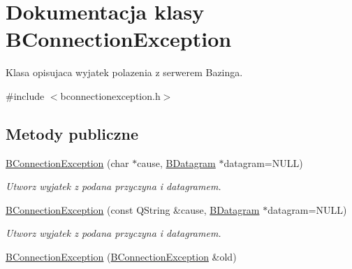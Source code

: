 \hypertarget{class_b_connection_exception}{
\section{Dokumentacja klasy BConnectionException}
\label{class_b_connection_exception}
}


Klasa opisujaca wyjatek polazenia z serwerem Bazinga.  




{\ttfamily \#include $<$bconnectionexception.h$>$}

\subsection*{Metody publiczne}
\begin{DoxyCompactItemize}
\item 
\hypertarget{class_b_connection_exception_a8434b332707e6b981af493ac142ddc34}{
\hyperlink{class_b_connection_exception_a8434b332707e6b981af493ac142ddc34}{BConnectionException} (char $\ast$cause, \hyperlink{class_b_datagram}{BDatagram} $\ast$datagram=NULL)}
\label{class_b_connection_exception_a8434b332707e6b981af493ac142ddc34}

\begin{DoxyCompactList}\small\item\em Utworz wyjatek z podana przyczyna i datagramem. \item\end{DoxyCompactList}\item 
\hypertarget{class_b_connection_exception_ae805b541430e9a3e2af7750a4385ca64}{
\hyperlink{class_b_connection_exception_ae805b541430e9a3e2af7750a4385ca64}{BConnectionException} (const QString \&cause, \hyperlink{class_b_datagram}{BDatagram} $\ast$datagram=NULL)}
\label{class_b_connection_exception_ae805b541430e9a3e2af7750a4385ca64}

\begin{DoxyCompactList}\small\item\em Utworz wyjatek z podana przyczyna i datagramem. \item\end{DoxyCompactList}\item 
\hypertarget{class_b_connection_exception_aa28e0f3ae8e5dc4a2154f106a289e470}{
\hyperlink{class_b_connection_exception_aa28e0f3ae8e5dc4a2154f106a289e470}{BConnectionException} (\hyperlink{class_b_connection_exception}{BConnectionException} \&old)}
\label{class_b_connection_exception_aa28e0f3ae8e5dc4a2154f106a289e470}


\end{DoxyCompactItemize}
